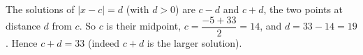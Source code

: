The solutions of $|x-c|=d$ (with $d>0$) are $c-d$ and $c+d$, the two points at distance $d$ from $c$. So $c$ is their midpoint, $c=\dfrac{-5+33}{2}=14$, and $d=33-14=19$. Hence $c+d=\boxed{33}$ (indeed $c+d$ is the larger solution).
